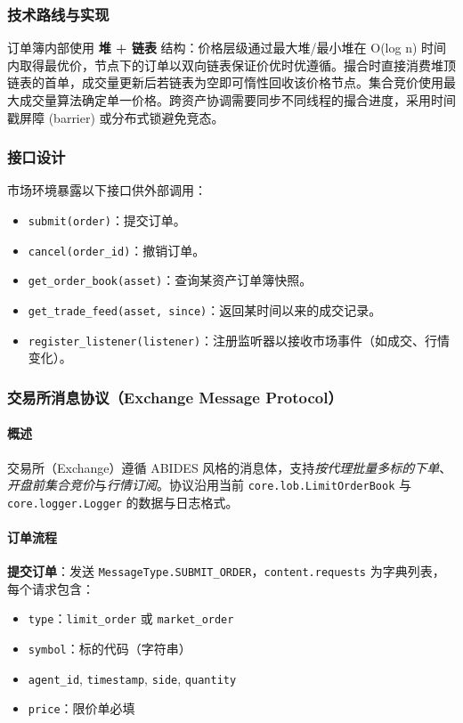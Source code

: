 \subsubsection{技术路线与实现}
订单簿内部使用 \textbf{堆 + 链表} 结构：价格层级通过最大堆/最小堆在 O(log n) 时间内取得最优价，节点下的订单以双向链表保证价优时优遵循。撮合时直接消费堆顶链表的首单，成交量更新后若链表为空即可惰性回收该价格节点。集合竞价使用最大成交量算法确定单一价格。跨资产协调需要同步不同线程的撮合进度，采用时间戳屏障 (barrier) 或分布式锁避免竞态。

\subsubsection{接口设计}
市场环境暴露以下接口供外部调用：
\begin{itemize}
  \item \verb|submit(order)|：提交订单。
  \item \verb|cancel(order_id)|：撤销订单。
  \item \verb|get_order_book(asset)|：查询某资产订单簿快照。
  \item \verb|get_trade_feed(asset, since)|：返回某时间以来的成交记录。
  \item \verb|register_listener(listener)|：注册监听器以接收市场事件（如成交、行情变化）。
\end{itemize}

\subsubsection{交易所消息协议（Exchange Message Protocol）}

\paragraph{概述}

交易所（Exchange）遵循 ABIDES 风格的消息体，支持\emph{按代理批量多标的下单}、\emph{开盘前集合竞价}与\emph{行情订阅}。协议沿用当前 \verb|core.lob.LimitOrderBook| 与 \verb|core.logger.Logger| 的数据与日志格式。

\paragraph{订单流程}
\textbf{提交订单}：发送 \verb|MessageType.SUBMIT_ORDER|，\verb|content.requests| 为字典列表，每个请求包含：
\begin{itemize}
  \item \texttt{type}：\verb|limit_order| 或 \verb|market_order|
  \item \texttt{symbol}：标的代码（字符串）
  \item \texttt{agent\_id}, \texttt{timestamp}, \texttt{side}, \texttt{quantity}
  \item \texttt{price}：限价单必填
\end{itemize}

